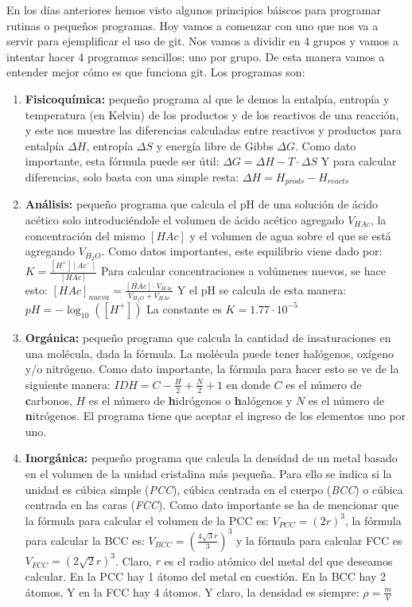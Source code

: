 \documentclass[10pt,letterpaper]{article}
\begin{document}
En los d\'ias anteriores hemos visto algunos principios b\'aiscos para programar rutinas o peque\~nos programas. Hoy vamos a comenzar con uno que nos va a servir para ejemplificar el uso de git. Nos vamos a dividir en 4 grupos y vamos a intentar hacer 4 programas sencillos; uno por grupo. De esta manera vamos a entender mejor c\'omo es que funciona git. Los programas son:

\begin{enumerate}
\item \textbf{Fisicoqu\'imica:} peque\~no programa al que le demos la entalp\'ia, entrop\'ia y temperatura (en Kelvin) de los productos y de los reactivos de una reacci\'on, y este nos muestre las diferencias calculadas entre reactivos y productos para entalp\'ia $\Delta H$, entrop\'ia $\Delta S$ y energ\'ia libre de Gibbs $\Delta G$. Como dato importante, esta f\'ormula puede ser \'util: $\Delta G = \Delta H - T \cdot \Delta S$ Y para calcular diferencias, solo basta con una simple resta: $\Delta H = H_{prods} - H_{reacts}$
\item \textbf{An\'alisis:} peque\~no programa que calcula el pH de una soluci\'on de \'acido ac\'etico solo introduci\'endole el volumen de \'acido ac\'etico agregado $V_{HAc}$, la concentraci\'on del mismo $\left[ HAc \right]$ y el volumen de agua sobre el que se est\'a agregando $V_{H_2 O}$. Como datos importantes, este equilibrio viene dado por: $K = \frac{\left[ H^+ \right] \left[ Ac^- \right]}{\left[ HAc \right]}$ Para calcular concentraciones a vol\'umenes nuevos, se hace esto: $\left[ HAc \right]_{nueva} = \frac{\left[ HAc \right] \cdot V_{HAc}}{V_{H_2 O} + V_{HAc}}$ Y el pH se calcula de esta manera: $pH = - \log_{10} \left( \left[ H^+ \right] \right)$ La constante es $K = 1.77 \cdot 10^{-5}$
\item \textbf{Org\'anica:} peque\~no programa que calcula la cantidad de insaturaciones en una mol\'ecula, dada la f\'ormula. La mol\'ecula puede tener hal\'ogenos, ox\'igeno y/o nitr\'ogeno. Como dato importante, la f\'ormula para hacer esto se ve de la siguiente manera: $IDH = C - \frac{H}{2} + \frac{N}{2} + 1$ en donde $C$ es el n\'umero de \textbf{c}arbonos, $H$ es el n\'umero de \textbf{h}idr\'ogenos o \textbf{h}al\'ogenos y $N$ es el n\'umero de \textbf{n}itr\'ogenos. El programa tiene que aceptar el ingreso de los elementos uno por uno.
\item \textbf{Inorg\'anica:} peque\~no programa que calcula la densidad de un metal basado en el volumen de la unidad cristalina m\'as peque\~na. Para ello se indica si la unidad es c\'ubica simple (\emph{PCC}), c\'ubica centrada en el cuerpo (\emph{BCC}) o c\'ubica centrada en las caras (\emph{FCC}). Como dato importante se ha de mencionar que la f\'ormula para calcular el volumen de la PCC es: $V_{PCC} = \left( 2 r \right)^3$, la f\'ormula para calcular la BCC es: $V_{BCC} = \left( \frac{4 \sqrt{3} r}{3} \right)^3$ y la f\'ormula para calcular FCC es $V_{FCC} = \left( 2 \sqrt{2} r \right)^3$. Claro, $r$ es el radio at\'omico del metal del que deseamos calcular. En la PCC hay 1 \'atomo del metal en cuesti\'on. En la BCC hay 2 \'atomos. Y en la FCC hay 4 \'atomos. Y claro, la densidad es siempre: $\rho = \frac{m}{V}$
\end{enumerate}
\end{document}
